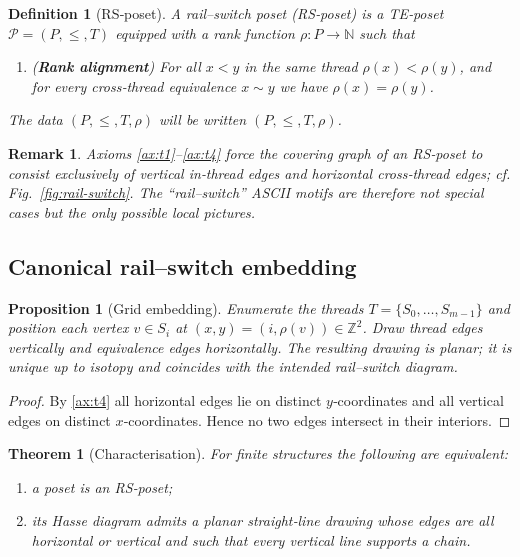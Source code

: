 \documentclass{article}
\newtheorem{definition}{Definition}
\newtheorem{proposition}{Proposition}
\newtheorem{theorem}{Theorem}
\newtheorem{remark}{Remark}
\begin{document}
\begin{definition}[RS‑poset]\label{def:RS}
A \emph{rail--switch poset} (RS‑poset) is a TE‑poset
$\mathcal P=(P,\le,T)$ equipped with a \emph{rank function}
$\rho:P\to\mathbb N$ such that
\begin{enumerate}[label=\textbf{T4}, wide=0pt]
 \item\label{ax:t4} (\textbf{Rank alignment})  For all $x<y$ in the same
   thread $\rho(x)<\rho(y)$, and for every cross‑thread equivalence
   $x\sim y$ we have $\rho(x)=\rho(y)$.
\end{enumerate}
The data $(P,\le,T,\rho)$ will be written $(P,\le,T,\rho)$.
\end{definition}

\begin{remark}
Axioms \ref{ax:t1}--\ref{ax:t4} force the covering graph of an
RS‑poset to consist \emph{exclusively} of vertical in‑thread edges and
horizontal cross‑thread edges; cf. Fig.~\ref{fig:rail-switch}.  The
``rail--switch'' ASCII motifs are therefore not special cases but the
\emph{only} possible local pictures.
\end{remark}

\subsection{Canonical rail--switch embedding}

\begin{proposition}[Grid embedding]\label{prop:RSplanar}
Enumerate the threads $T=\{S_0,\dots,S_{m-1}\}$ and position each
vertex $v\in S_i$ at $(x,y)=(i,\rho(v))\in\mathbb Z^2$.  Draw
\emph{thread edges} vertically and \emph{equivalence edges}
horizontally.  The resulting drawing is planar; it is unique up to
isotopy and coincides with the intended rail--switch diagram.
\end{proposition}

\begin{proof}
By \ref{ax:t4} all horizontal edges lie on distinct $y$‑coordinates and
all vertical edges on distinct $x$‑coordinates.  Hence no two edges
intersect in their interiors.
\end{proof}

\begin{theorem}[Characterisation]
For finite structures the following are equivalent:
\begin{enumerate}[label=\textup{(\alph*)}]
  \item a poset is an RS‑poset;
  \item its Hasse diagram admits a planar straight‑line drawing whose
        edges are \emph{all} horizontal or vertical and such that every
        vertical line supports a chain.
\end{enumerate}
\end{theorem}
\end{document}
